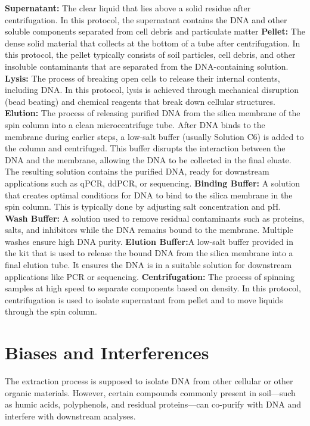 \documentclass[12pt]{SOP5_beta}\usepackage[]{graphicx}\usepackage[]{xcolor}
\begin{document}
\NP
\textbf{Supernatant:} The clear liquid that lies above a solid residue after centrifugation. In this protocol, the supernatant contains the DNA and other soluble components separated from cell debris and particulate matter
\NP
\textbf{Pellet:} The dense solid material that collects at the bottom of a tube after centrifugation. In this protocol, the pellet typically consists of soil particles, cell debris, and other insoluble contaminants that are separated from the DNA-containing solution.
\NP
\textbf{Lysis:} The process of breaking open cells to release their internal contents, including DNA. In this protocol, lysis is achieved through mechanical disruption (bead beating) and chemical reagents that break down cellular structures.
\NP
\textbf{Elution:} The process of releasing purified DNA from the silica membrane of the spin column into a clean microcentrifuge tube. After DNA binds to the membrane during earlier steps, a low-salt buffer (usually Solution C6) is added to the column and centrifuged. This buffer disrupts the interaction between the DNA and the membrane, allowing the DNA to be collected in the final eluate. The resulting solution contains the purified DNA, ready for downstream applications such as qPCR, ddPCR, or sequencing.
\NP
\textbf{Binding Buffer:} A solution that creates optimal conditions for DNA to bind to the silica membrane in the spin column. This is typically done by adjusting salt concentration and pH.
\NP
\textbf{Wash Buffer:} A solution used to remove residual contaminants such as proteins, salts, and inhibitors while the DNA remains bound to the membrane. Multiple washes ensure high DNA purity.
\NP
\textbf{Elution Buffer:}A low-salt buffer provided in the kit that is used to release the bound DNA from the silica membrane into a final elution tube. It ensures the DNA is in a suitable solution for downstream applications like PCR or sequencing.
\NP
\textbf{Centrifugation:} The process of spinning samples at high speed to separate components based on density. In this protocol, centrifugation is used to isolate supernatant from pellet and to move liquids through the spin column.

\section{Biases and Interferences}
\NP The extraction process is supposed to isolate DNA from other cellular or other organic materials. However, certain compounds commonly present in soil—such as humic acids, polyphenols, and residual proteins—can co-purify with DNA and interfere with downstream analyses.
\end{document}
